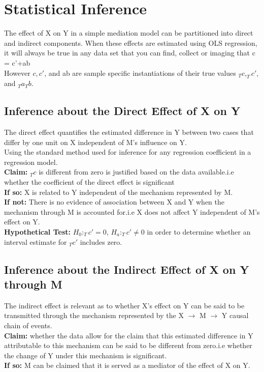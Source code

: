 \documentclass{article}
\theoremstyle{definition}
\begin{document}
\section{Statistical Inference}
The effect of X on Y in a simple mediation model can be partitioned into direct and indirect components. When these effects are estimated using OLS regression, it will always be true in any data set that you can find, collect or imaging that c = c'+ab \\
However $c, c'$, and ab are sample specific instantiations of their true values $_Tc, _Tc',$ and $_Ta_Tb$.

\subsection{Inference about the Direct Effect of X on Y}
The direct effect quantifies the estimated difference in Y between two cases that differ by one unit on X independent of M's influence on Y.\\
Using the standard method used for inference for any regression coefficient in a regression model.\\
\textbf{Claim: }$_Tc$ is different from zero is justified based on the data available.i.e whether the coefficient of the direct effect is significant\\
\textbf{If so:} X is related to Y independent of the mechanism represented by M.\\
\textbf{If not: }There is no evidence of association between X and Y when the mechanism through M is accounted for.i.e X does not affect Y independent of M's effect on Y.\\
\textbf{Hypothetical Test: } $H_0: _Tc'=0$, $H_a:_Tc' \neq 0$ in order to determine whether an interval estimate for $_Tc'$ includes zero. 

\subsection{Inference about the Indirect Effect of X on Y through M}
The indirect effect is relevant as to whether X's effect on Y can be said to be transmitted through the mechanism represented by the X $\rightarrow $ M $\rightarrow$ Y causal chain of events. \\
\textbf{Claim: }whether the data allow for the claim that this estimated difference in Y attributable to this mechanism can be said to be different from zero.i.e whether the change of Y under this mechanism is significant.\\
\textbf{If so: } M can be claimed that it is served as a mediator of the effect of X on Y.
\end{document}
